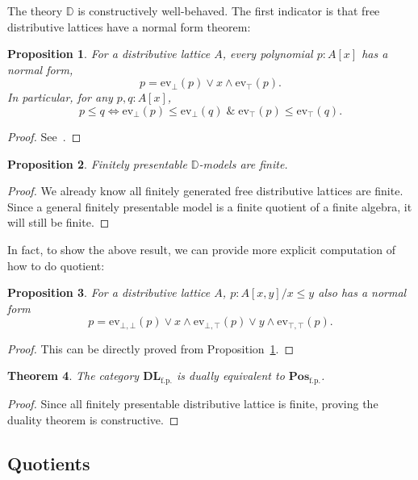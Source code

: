\documentclass[12pt]{amsart}
\newtheorem{theorem}{Theorem}[section]
\newtheorem{proposition}[theorem]{Proposition}
\theoremstyle{definition}
\newcommand{\mb}[1]{\mathbf{#1}}
\newcommand{\mbb}[1]{\mathbb{#1}}
\newcommand{\mr}[1]{\mathrm{#1}}
\newcommand{\Pos}{\mb{Pos}}
\newcommand{\DL}{\mb{DL}}
\newcommand{\eff}{\Leftrightarrow}
\newcommand{\conjt}{\;\&\;}
\newcommand{\ev}{\mathrm{ev}}
\newcommand{\fp}{_{\mr{f.p.}}}
\begin{document}
The theory $\mbb D$ is constructively well-behaved. The first indicator is that free distributive lattices have a normal form theorem:

\begin{proposition}\label{prop:normalform}
  For a distributive lattice $A$, every polynomial $p : A[x]$ has a normal form,
  \[ p = \ev_\bot(p) \vee x \wedge \ev_\top(p). \]
  In particular, for any $p,q : A[x]$,
  \[ p \le q \eff \ev_\bot(p) \le \ev_\bot(q) \conjt \ev_\top(p) \le \ev_\top(q). \]
\end{proposition}
\begin{proof}
  See~\cite[Thm. 10.11]{lausch2000algebra}.
\end{proof}

\begin{proposition}
  Finitely presentable $\mbb D$-models are finite.
\end{proposition}
\begin{proof}
  We already know all finitely generated free distributive lattices are finite. Since a general finitely presentable model is a finite quotient of a finite algebra, it will still be finite.
\end{proof}

In fact, to show the above result, we can provide more explicit computation of how to do quotient:

\begin{proposition}\label{prop:lenormalform}
  For a distributive lattice $A$, $p : A[x,y]/x\le y$ also has a normal form
  \[ p = \ev_{\bot,\bot}(p) \vee x \wedge \ev_{\bot,\top}(p) \vee y \wedge \ev_{\top,\top}(p). \]
\end{proposition}
\begin{proof}
  This can be directly proved from Proposition~\ref{prop:normalform}.
\end{proof}

\begin{theorem}\label{thm:finitedualityfordl}
  The category $\DL\fp$ is dually equivalent to $\Pos\fp$.
\end{theorem}
\begin{proof}
  Since all finitely presentable distributive lattice is finite, proving the duality theorem is constructive.
\end{proof}



\subsection{Quotients}
\end{document}
